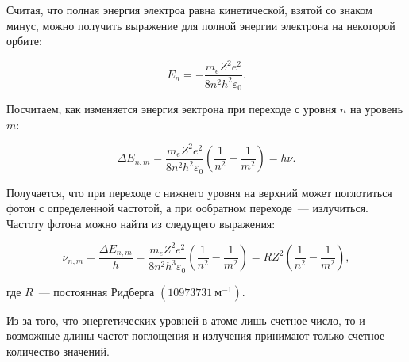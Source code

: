 	Считая, что полная энергия электроа равна кинетической, взятой со знаком минус, можно получить выражение для полной энергии электрона на некоторой орбите:
	
	\begin{equation}
	E_n = -\frac{m_e Z^2 e^2}{8 n^2 h^2 \varepsilon_0}.
	\end{equation}
	
	Посчитаем, как изменяется энергия эектрона при переходе с уровня $n$ на уровень $m$:
	
	\begin{equation}
	\Delta E_{n, m} = \frac{m_e Z^2 e^2}{8 n^2 h^2 \varepsilon_0} \left( \frac{1}{n^2} - \frac{1}{m^2}\right) = h \nu.
	\end{equation}
	
	Получается, что при переходе с нижнего уровня на верхний может поглотиться фотон с определенной частотой, а при ообратном переходе~--- излучиться. Частоту фотона можно найти из следущего выражения:
	
	\begin{equation}
	\nu_{n, m} =  
	\frac{\Delta E_{n, m}}{h} = \frac{m_e Z^2 e^2}{8 n^2 h^3 \varepsilon_0} \left( \frac{1}{n^2} - \frac{1}{m^2}\right) = R Z^2 \left(\frac{1}{n^2} - \frac{1}{m^2} \right),
	\end{equation}
	
	где $R$~--- постоянная Ридберга $(10973731~\text{м}^{-1})$.
	
	Из-за того, что энергетических уровней в атоме лишь счетное число, то и возможные длины частот поглощения и излучения принимают только счетное количество значений.